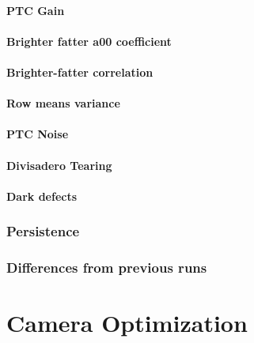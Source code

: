 \paragraph{PTC Gain}\label{ptc-gain-1}

\paragraph{\texorpdfstring{Brighter fatter a{00}
coefficient}{Brighter fatter a00 coefficient}}\label{brighter-fatter-a00-coefficient-1}

\paragraph{Brighter-fatter
correlation}\label{brighter-fatter-correlation}

\paragraph{Row means variance}\label{row-means-variance}

\paragraph{PTC Noise}\label{ptc-noise}

\paragraph{Divisadero Tearing}\label{divisadero-tearing-1}

\paragraph{Dark defects}\label{dark-defects-1}

\subsubsection{Persistence}\label{persistence-1}

\subsubsection{Differences from previous
runs}\label{differences-from-previous-runs-1}


\section{Camera Optimization}\label{camera-optimization}

